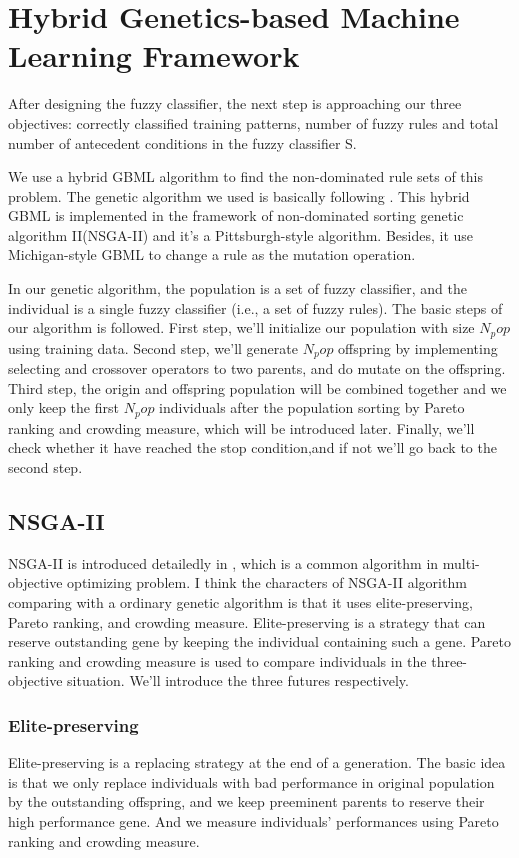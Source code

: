 \documentclass[conference]{IEEEtran}
\begin{document}
  \section{Hybrid Genetics-based Machine Learning Framework}
	 \par After designing the fuzzy classifier, the next step is approaching our three objectives: correctly classified training patterns, number of fuzzy rules and total number of antecedent conditions in the fuzzy classifier S.
	 \par
	 We use a hybrid GBML algorithm to find the non-dominated rule sets of this problem. The genetic algorithm we used is basically following \cite{ISHIBUCHI20074}. This hybrid GBML is implemented in the framework of non-dominated sorting genetic algorithm II(NSGA-II) and it's a Pittsburgh-style algorithm. Besides, it use Michigan-style GBML to change a rule as the mutation operation. 
	 \par
	In our genetic algorithm, the population is a set of fuzzy classifier, and the individual is a single fuzzy classifier (i.e., a set of fuzzy rules). The basic steps of our algorithm is followed. First step, we'll initialize our population with size $N_pop$ using training data. Second step, we'll generate $N_pop$ offspring by implementing selecting and crossover operators to two parents, and do mutate on the offspring. Third step, the origin and offspring population will be combined together and we only keep the first $N_pop$ individuals after the population sorting by Pareto ranking and crowding measure, which will be introduced later. Finally, we'll check whether it have reached the stop condition,and if not we'll go back to the second step.
	 
	 \subsection{NSGA-II}
	 \par
	 NSGA-II is introduced detailedly in \cite{996017}, which is a common algorithm in multi-objective optimizing problem. I think the characters of NSGA-II algorithm comparing with a ordinary genetic algorithm is that it uses elite-preserving, Pareto ranking, and crowding measure. Elite-preserving is a strategy that can reserve outstanding gene by keeping the individual containing such a gene. Pareto ranking and crowding measure is used to compare individuals in the three-objective situation. We'll introduce the three futures respectively.
	 \subsubsection{Elite-preserving}
	 \par
	 Elite-preserving is a replacing strategy at the end of a generation. The basic idea is that we only replace individuals with bad performance in original population by the outstanding offspring, and we keep preeminent parents to reserve their high performance gene. And we measure individuals' performances using Pareto ranking and crowding measure.
	 
\end{document}
